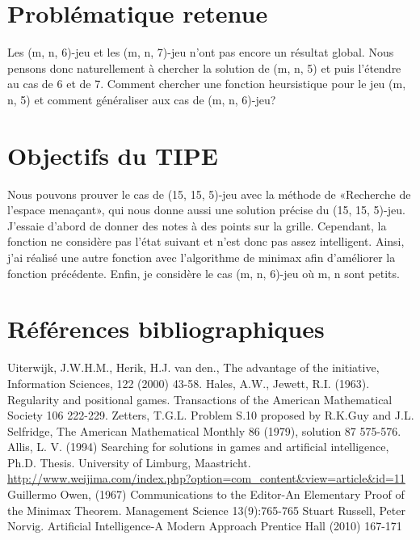 \documentclass[12pt,a4paper]{article}
\begin{document}
\section*{\bfseries Problématique retenue}
\hspace*{7mm}Les (m, n, 6)-jeu et les (m, n, 7)-jeu n'ont pas encore un résultat global. Nous pensons donc naturellement à chercher la solution de (m, n, 5) et puis l'étendre au cas de 6 et de 7. Comment chercher une fonction heursistique pour le jeu (m, n, 5) et comment généraliser aux cas de (m, n, 6)-jeu?
\section*{\bfseries Objectifs du TIPE}
\hspace*{7mm}Nous pouvons prouver le cas de (15, 15, 5)-jeu avec la méthode de «Recherche de l'espace menaçant», qui nous donne aussi une solution précise du (15, 15, 5)-jeu. J'essaie d'abord de donner des notes à des points sur la grille. Cependant, la fonction ne considère pas l'état suivant et n'est donc pas assez intelligent. Ainsi, j'ai réalisé une autre fonction avec l'algorithme de minimax afin d'améliorer la fonction précédente. Enfin, je considère le cas (m, n, 6)-jeu où m, n sont petits. 
\section*{\bfseries Références bibliographiques}
\begingroup
\renewcommand{\section}[2]{}%
\begin{thebibliography}{10}
    Uiterwijk, J.W.H.M., Herik, H.J. van den., The advantage of the initiative, Information Sciences, 122 (2000) 43-58.
    Hales, A.W., Jewett, R.I. (1963). Regularity and positional games. Transactions of the American Mathematical Society 106 222-229.
    Zetters, T.G.L. Problem S.10 proposed by R.K.Guy and J.L. Selfridge, The American Mathematical Monthly 86 (1979), solution 87 575-576.
    Allis, L. V. (1994) Searching for solutions in games and artificial intelligence, Ph.D. Thesis. University of Limburg, Maastricht.
    \url{http://www.weijima.com/index.php?option=com_content&view=article&id=11}
    Guillermo Owen, (1967) Communications to the Editor-An Elementary Proof of the Minimax Theorem. Management Science 13(9):765-765
    Stuart Russell, Peter Norvig. Artificial Intelligence-A Modern Approach Prentice Hall (2010) 167-171
\end{thebibliography}
\endgroup
\end{document}

